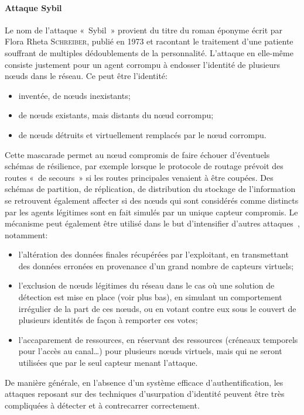         \paragraph{Attaque Sybil}
Le nom de l'attaque « Sybil » provient du titre du roman éponyme écrit par Flora Rheta \textsc{Schreiber}, publié en 1973 et racontant le traitement d'une patiente souffrant de multiples dédoublements de la personnalité.
L'attaque en elle-même consiste justement pour un agent corrompu à endosser l'identité de plusieurs nœuds dans le réseau.
Ce peut être l'identité:
\begin{itemize}
    \item inventée, de nœuds inexistants;
    \item de nœuds existants, mais distants du nœud corrompu;
    \item de nœuds détruits et virtuellement remplacés par le nœud corrompu.
\end{itemize}
Cette mascarade permet au nœud compromis de faire échouer d'éventuels schémas de résilience, par exemple lorsque le protocole de routage prévoit des routes « de secours » si les routes principales venaient à être coupées.
Des schémas de partition, de réplication, de distribution du stockage de l'information se retrouvent également affecter si des nœuds qui sont considérés comme distincts par les agents légitimes sont en fait simulés par un unique capteur compromis.
Le mécanisme peut également être utilisé dans le but d'intensifier d'autres attaques~\cite{NSSP04}, notamment:
\begin{itemize}
    \item l'altération des données finales récupérées par l'exploitant, en transmettant des données erronées en provenance d'un grand nombre de capteurs virtuels;
    \item l'exclusion de nœuds légitimes du réseau dans le cas où une solution de détection est mise en place (voir plus bas), en simulant un comportement irrégulier de la part de ces nœuds, ou en votant contre eux sous le couvert de plusieurs identités de façon à remporter ces votes;
    \item l'accaparement de ressources, en réservant des ressources (créneaux temporels pour l'accès au canal\dots) pour plusieurs nœuds virtuels, mais qui ne seront utilisées que par le seul capteur menant l'attaque.
\end{itemize}
De manière générale, en l'absence d'un système efficace d'authentification, les attaques reposant sur des techniques d'usurpation d'identité peuvent être très compliquées à détecter et à contrecarrer correctement.

